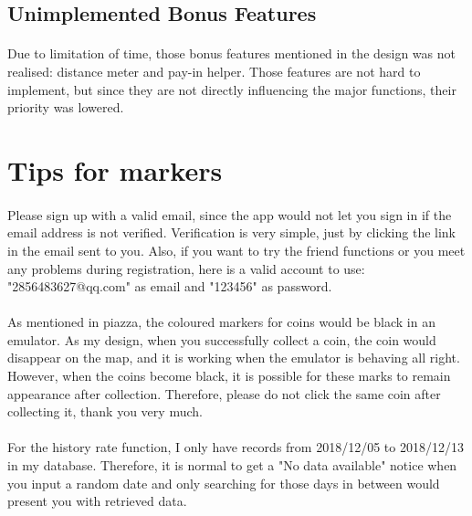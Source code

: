 \documentclass[12pt]{article}
\begin{document}
\subsection{Unimplemented Bonus Features}
\paragraph{}
Due to limitation of time, those bonus features mentioned in the design was not realised: distance meter and pay-in helper. Those features are not hard to implement, but since they are not directly influencing the major functions, their priority was lowered.

%
%
\section{Tips for markers}
\paragraph{}
Please sign up with a valid email, since the app would not let you sign in if the email address is not verified. Verification is very simple, just by clicking the link in the email sent to you. Also, if you want to try the friend functions or you meet any problems during registration, here is a valid account to use: "2856483627@qq.com" as email and "123456" as password.
\paragraph{}
As mentioned in piazza, the coloured markers for coins would be black in an emulator. As my design, when you successfully collect a coin, the coin would disappear on the map, and it is working when the emulator is behaving all right. However, when the coins become black, it is possible for these marks to remain appearance after collection. Therefore, please do not click the same coin after collecting it, thank you very much.
\paragraph{}
For the history rate function, I only have records from 2018/12/05 to 2018/12/13 in my database. Therefore, it is normal to get a "No data available" notice when you input a random date and only searching for those days in between would present you with retrieved data.
\end{document}
